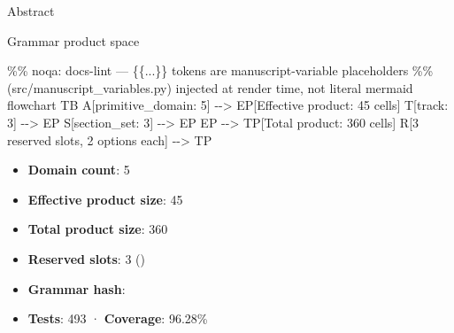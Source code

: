 \documentclass[
  ignorenonframetext,
]{beamer}
\newenvironment{Shaded}{}{}
\newcommand{\NormalTok}[1]{#1}
\providecommand{\tightlist}{%
  \setlength{\itemsep}{0pt}\setlength{\parskip}{0pt}}
\begin{document}
\begin{frame}{Abstract}
\begin{block}{Grammar product space}
\protect{}\label{grammar-product-space}
\begin{Shaded}
\begin{Highlighting}[]
\NormalTok{\%\% noqa: docs{-}lint — \{\{...\}\} tokens are manuscript{-}variable placeholders}
\NormalTok{\%\% (src/manuscript\_variables.py) injected at render time, not literal mermaid}
\NormalTok{flowchart TB}
\NormalTok{    A[primitive\_domain: 5] {-}{-}\textgreater{} EP[Effective product: 45 cells]}
\NormalTok{    T[track: 3] {-}{-}\textgreater{} EP}
\NormalTok{    S[section\_set: 3] {-}{-}\textgreater{} EP}
\NormalTok{    EP {-}{-}\textgreater{} TP[Total product: 360 cells]}
\NormalTok{    R[3 reserved slots, 2 options each] {-}{-}\textgreater{} TP}
\end{Highlighting}
\end{Shaded}

\begin{itemize}
\tightlist
\item
  \textbf{Domain count}: 5
\item
  \textbf{Effective product size}: 45
\item
  \textbf{Total product size}: 360
\item
  \textbf{Reserved slots}: 3
  ()
\item
  \textbf{Grammar hash}: 
\item
  \textbf{Tests}: 493 · \textbf{Coverage}: 96.28\%
\end{itemize}
\end{block}
\end{frame}
\end{document}
